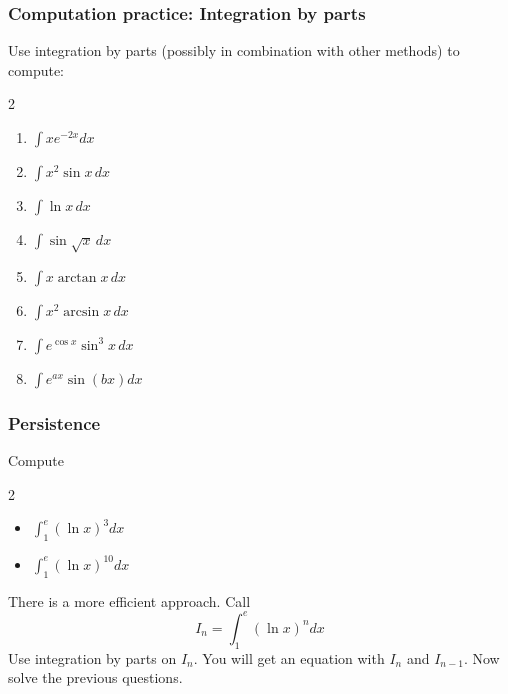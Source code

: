 \documentclass[14pt]{beamer}
\begin{document}
\begin{frame}[t]
	\frametitle{Computation practice: Integration by parts}

	Use integration by parts (possibly in combination with other methods) to
	compute:
	\begin{multicols}{2}
		\begin{enumerate}
			\item $\displaystyle \int x e^{-2x}dx$
				\vspace{.2cm}

			\item $\displaystyle \int x^{2}\sin x \, dx$
				\vspace{.2cm}

			\item $\displaystyle \int \ln x \, dx$
				\vspace{.2cm}

			\item $\displaystyle \int \sin \sqrt{x}\, dx$
				\vspace{.2cm}

			\item $\displaystyle \int x \arctan x \, dx$
				\vspace{.2cm}

			\item $\displaystyle \int x^{2}\arcsin x \, dx$
				\vspace{.2cm}

			\item $\displaystyle \int e^{\cos x}\sin^{3}x \, dx$
				\vspace{.2cm}

			\item $\displaystyle \int e^{ax}\sin (bx) dx$
				\vspace{.2cm}
		\end{enumerate}
	\end{multicols}
\end{frame}

\begin{frame}[t]
	\frametitle{Persistence}
	Compute
	\begin{multicols}{2}
		\begin{itemize}
			\item $\displaystyle \int_{1}^{e}\left( \ln x \right)^{3}dx$
				\vspace{.2cm}

			\item $\displaystyle \int_{1}^{e}\left( \ln x \right)^{10}dx$
		\end{itemize}
	\end{multicols}
	There is a more efficient approach. Call
	\[
		I_{n}= \int_{1}^{e}\left( \ln x \right)^{n}dx
	\]
	Use integration by parts on $I_{n}$. You will get an equation with $I_{n}$ and
	$I_{n-1}$. Now solve the previous questions.

	\vfill
	\hfill \href{https://oeis.org/}{}
\end{frame}
\end{document}
